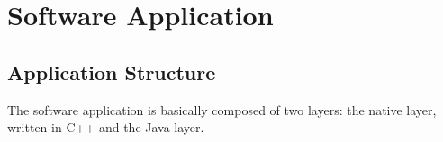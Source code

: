 
\chapter{Software Application}\label{Software Application}

\section{Application Structure}
The software application is basically composed of two layers: the native layer, written in C++ and the Java layer.

\